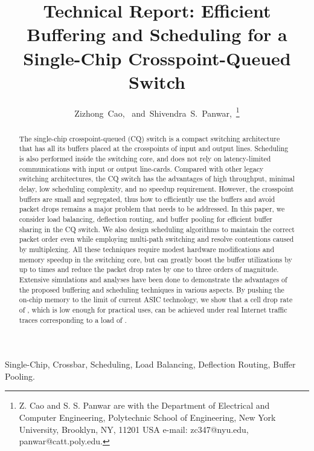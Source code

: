 \documentclass[journal,final,doublecolumn,10pt,twoside]{IEEEtranTCOM} \normalsize
\newcommand*{\TitleFont}{\usefont{\encodingdefault}{\rmdefault}{}{n}\fontsize{23}{28}\selectfont}
\begin{document}
\title{\TitleFont Technical Report: Efficient Buffering and Scheduling for a Single-Chip Crosspoint-Queued Switch}

\author{Zizhong~Cao,~
        and~Shivendra~S.~Panwar,~\thanks{Z. Cao and S. S. Panwar are with the Department
of Electrical and Computer Engineering, Polytechnic School of Engineering, New York University, Brooklyn,
NY, 11201 USA e-mail: zc347@nyu.edu, panwar@catt.poly.edu.}}





\maketitle


\begin{abstract}
The single-chip crosspoint-queued (CQ) switch is a compact switching architecture that has all its buffers placed at the crosspoints of input and output lines. Scheduling is also performed inside the switching core, and does not rely on latency-limited communications with input or output line-cards. Compared with other legacy switching architectures, the CQ switch has the advantages of high throughput, minimal delay, low scheduling complexity, and no speedup requirement. However, the crosspoint buffers are small and segregated, thus how to efficiently use the buffers and avoid packet drops remains a major problem that needs to be addressed. In this paper, we consider load balancing, deflection routing, and buffer pooling for efficient buffer sharing in the CQ switch. We also design scheduling algorithms to maintain the correct packet order even while employing multi-path switching and resolve contentions caused by multiplexing. All these techniques require modest hardware modifications and memory speedup in the switching core, but can greatly boost the buffer utilizations by up to  times and reduce the packet drop rates by one to three orders of magnitude. Extensive simulations and analyses have been done to demonstrate the advantages of the proposed buffering and scheduling techniques in various aspects. By pushing the on-chip memory to the limit of current ASIC technology, we show that a cell drop rate of , which is low enough for practical uses, can be achieved under real Internet traffic traces corresponding to a load of .
\end{abstract}

\begin{IEEEkeywords}
Single-Chip, Crossbar, Scheduling, Load Balancing, Deflection Routing, Buffer Pooling.
\end{IEEEkeywords}
\end{document}
